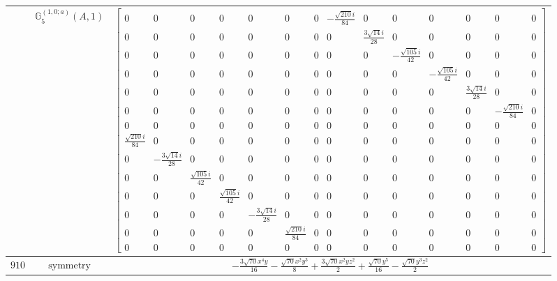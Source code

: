 \documentclass[fleqn,8pt,landscape]{jsarticle}
\begin{document}
\begin{longtable}{ccc}
$  $ & $ \mathbb{G}_{5}^{(1,0;a)}(A,1) $ & $ \begin{bmatrix} 0 & 0 & 0 & 0 & 0 & 0 & 0 & - \frac{\sqrt{210} i}{84} & 0 & 0 & 0 & 0 & 0 & 0 \\ 0 & 0 & 0 & 0 & 0 & 0 & 0 & 0 & \frac{3 \sqrt{14} i}{28} & 0 & 0 & 0 & 0 & 0 \\ 0 & 0 & 0 & 0 & 0 & 0 & 0 & 0 & 0 & - \frac{\sqrt{105} i}{42} & 0 & 0 & 0 & 0 \\ 0 & 0 & 0 & 0 & 0 & 0 & 0 & 0 & 0 & 0 & - \frac{\sqrt{105} i}{42} & 0 & 0 & 0 \\ 0 & 0 & 0 & 0 & 0 & 0 & 0 & 0 & 0 & 0 & 0 & \frac{3 \sqrt{14} i}{28} & 0 & 0 \\ 0 & 0 & 0 & 0 & 0 & 0 & 0 & 0 & 0 & 0 & 0 & 0 & - \frac{\sqrt{210} i}{84} & 0 \\ 0 & 0 & 0 & 0 & 0 & 0 & 0 & 0 & 0 & 0 & 0 & 0 & 0 & 0 \\ \frac{\sqrt{210} i}{84} & 0 & 0 & 0 & 0 & 0 & 0 & 0 & 0 & 0 & 0 & 0 & 0 & 0 \\ 0 & - \frac{3 \sqrt{14} i}{28} & 0 & 0 & 0 & 0 & 0 & 0 & 0 & 0 & 0 & 0 & 0 & 0 \\ 0 & 0 & \frac{\sqrt{105} i}{42} & 0 & 0 & 0 & 0 & 0 & 0 & 0 & 0 & 0 & 0 & 0 \\ 0 & 0 & 0 & \frac{\sqrt{105} i}{42} & 0 & 0 & 0 & 0 & 0 & 0 & 0 & 0 & 0 & 0 \\ 0 & 0 & 0 & 0 & - \frac{3 \sqrt{14} i}{28} & 0 & 0 & 0 & 0 & 0 & 0 & 0 & 0 & 0 \\ 0 & 0 & 0 & 0 & 0 & \frac{\sqrt{210} i}{84} & 0 & 0 & 0 & 0 & 0 & 0 & 0 & 0 \\ 0 & 0 & 0 & 0 & 0 & 0 & 0 & 0 & 0 & 0 & 0 & 0 & 0 & 0 \end{bmatrix} $ \\ \hline
$ 910 $ & $ \text{symmetry} $ & $ - \frac{3 \sqrt{70} x^{4} y}{16} - \frac{\sqrt{70} x^{2} y^{3}}{8} + \frac{3 \sqrt{70} x^{2} y z^{2}}{2} + \frac{\sqrt{70} y^{5}}{16} - \frac{\sqrt{70} y^{3} z^{2}}{2} $ \\

\end{longtable}
\end{document}
